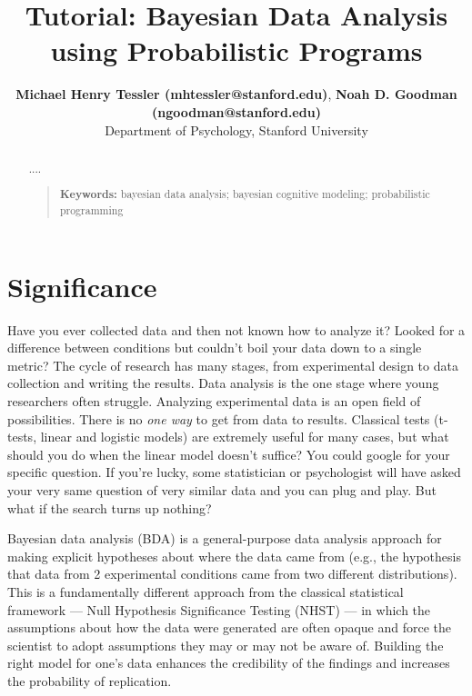 \documentclass[10pt,letterpaper]{article}
\title{Tutorial: Bayesian Data Analysis using Probabilistic Programs}
\author{{\large \bf Michael Henry Tessler (mhtessler@stanford.edu)}, {\large \bf Noah D. Goodman (ngoodman@stanford.edu)}  \\
  Department of Psychology, Stanford University
  }
\begin{document}
\maketitle

\begin{abstract}

....

\begin{quote}
\small
\textbf{Keywords:} 
bayesian data analysis; bayesian cognitive modeling; probabilistic programming
\end{quote}

\end{abstract}





\section{Significance}

Have you ever collected data and then not known how to analyze it? 
Looked for a difference between conditions but couldn't boil your data down to a single metric? 
The cycle of research has many stages, from experimental design to data collection and writing the results. 
Data analysis is the one stage where young researchers often struggle. 
Analyzing experimental data is an open field of possibilities. 
There is no \emph{one way} to get from data to results. 
Classical tests (t-tests, linear and logistic models) are extremely useful for many cases, but what should you do when the linear model doesn't suffice? 
You could google for your specific question. 
If you're lucky, some statistician or psychologist will have asked your very same question of very similar data and you can plug and play. 
But what if the search turns up nothing?

Bayesian data analysis (BDA) is a general-purpose data analysis approach for making explicit hypotheses about where the data came from (e.g., the hypothesis that data from 2 experimental conditions came from two different distributions). 
This is a fundamentally different approach from the classical statistical framework --- Null Hypothesis Significance Testing (NHST) --- in which the assumptions about how the data were generated are often opaque and force the scientist to adopt assumptions they may or may not be aware of. 
Building the right model for one's data enhances the credibility of the findings and increases the probability of replication. 
\end{document}
